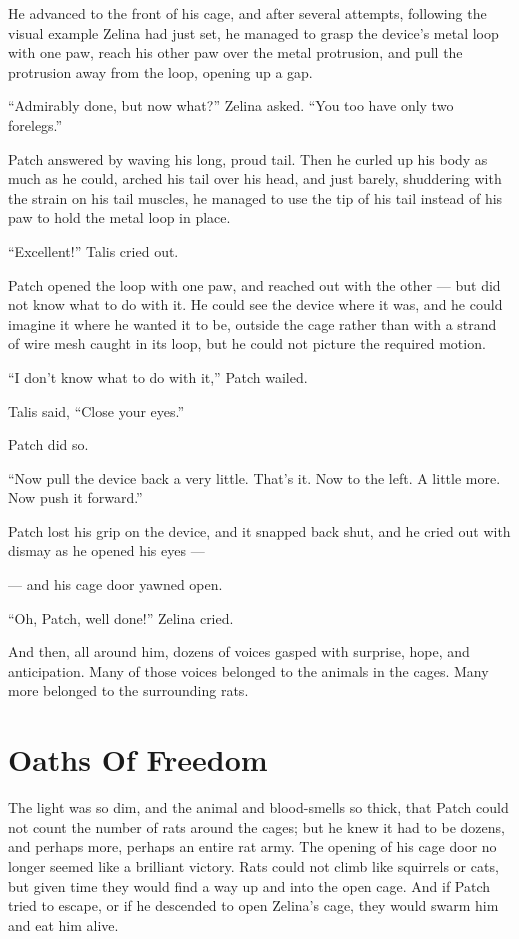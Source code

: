 \documentclass[ebook,oneside,openany,17pt]{memoir}
\renewcommand{\thechapter}{\Roman{chapter}}
\newcounter{sections}
\newcommand{\sections}[1]{%
  \section*{#1}
  \addtocounter{sections}{1}%
  \pdfbookmark[1]{#1}{section.\thechapter.\thesections}}
\begin{document}
He advanced to the front of his cage, and after several attempts,
following the visual example Zelina had just set, he managed to grasp
the device’s metal loop with one paw, reach his other paw over the
metal protrusion, and pull the protrusion away from the loop, opening
up a gap.

“Admirably done, but now what?” Zelina asked. “You too have only two
forelegs.”

Patch answered by waving his long, proud tail. Then he curled up his
body as much as he could, arched his tail over his head, and just
barely, shuddering with the strain on his tail muscles, he managed to
use the tip of his tail instead of his paw to hold the metal loop in
place.

“Excellent!” Talis cried out.

Patch opened the loop with one paw, and reached out with the other —
but did not know what to do with it. He could see the device where it
was, and he could imagine it where he wanted it to be, outside the
cage rather than with a strand of wire mesh caught in its loop, but he
could not picture the required motion.

“I don’t know what to do with it,” Patch wailed.

Talis said, “Close your eyes.”

Patch did so.

“Now pull the device back a very little. That’s it. Now to the left. A
little more. Now push it forward.”

Patch lost his grip on the device, and it snapped back shut, and he
cried out with dismay as he opened his eyes —

— and his cage door yawned open.

“Oh, Patch, well done!” Zelina cried.

And then, all around him, dozens of voices gasped with surprise, hope,
and anticipation. Many of those voices belonged to the animals in the
cages. Many more belonged to the surrounding rats.


\sections{Oaths Of Freedom}

The light was so dim, and the animal and blood-smells so thick, that
Patch could not count the number of rats around the cages; but he knew
it had to be dozens, and perhaps more, perhaps an entire rat army. The
opening of his cage door no longer seemed like a brilliant
victory. Rats could not climb like squirrels or cats, but given time
they would find a way up and into the open cage. And if Patch tried to
escape, or if he descended to open Zelina’s cage, they would swarm him
and eat him alive.
\end{document}
